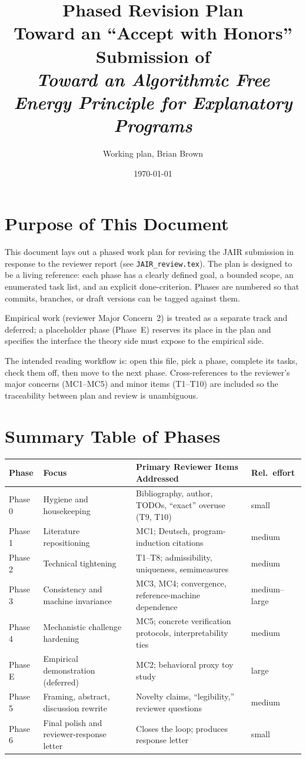 \documentclass[11pt]{article}
\title{Phased Revision Plan\\
\large Toward an ``Accept with Honors'' Submission of\\ \emph{Toward an Algorithmic Free Energy Principle for Explanatory Programs}}
\author{Working plan, Brian Brown}
\date{\today}
\begin{document}
\maketitle

\section*{Purpose of This Document}

This document lays out a phased work plan for revising the JAIR submission in response to the reviewer report (see \texttt{JAIR\_review.tex}). The plan is designed to be a living reference: each phase has a clearly defined goal, a bounded scope, an enumerated task list, and an explicit done-criterion. Phases are numbered so that commits, branches, or draft versions can be tagged against them.

Empirical work (reviewer Major Concern~2) is treated as a separate track and deferred; a placeholder phase (Phase~E) reserves its place in the plan and specifies the interface the theory side must expose to the empirical side.

The intended reading workflow is: open this file, pick a phase, complete its tasks, check them off, then move to the next phase. Cross-references to the reviewer's major concerns (MC1--MC5) and minor items (T1--T10) are included so the traceability between plan and review is unambiguous.

\section{Summary Table of Phases}

\begin{table}[h]
\centering
\renewcommand{\arraystretch}{1.15}
\begin{tabularx}{\textwidth}{@{}llXl@{}}
\toprule
\textbf{Phase} & \textbf{Focus} & \textbf{Primary Reviewer Items Addressed} & \textbf{Rel.\ effort} \\
\midrule
Phase 0 & Hygiene and housekeeping & Bibliography, author, TODOs, ``exact'' overuse (T9, T10) & small \\
Phase 1 & Literature repositioning & MC1; Deutsch, program-induction citations & medium \\
Phase 2 & Technical tightening & T1--T8; admissibility, uniqueness, semimeasures & medium \\
Phase 3 & Consistency and machine invariance & MC3, MC4; convergence, reference-machine dependence & medium--large \\
Phase 4 & Mechanistic challenge hardening & MC5; concrete verification protocols, interpretability ties & medium \\
Phase E & Empirical demonstration (deferred) & MC2; behavioral proxy toy study & large \\
Phase 5 & Framing, abstract, discussion rewrite & Novelty claims, ``legibility,'' reviewer questions & medium \\
Phase 6 & Final polish and reviewer-response letter & Closes the loop; produces response letter & small \\
\bottomrule
\end{tabularx}
\end{table}
\end{document}
